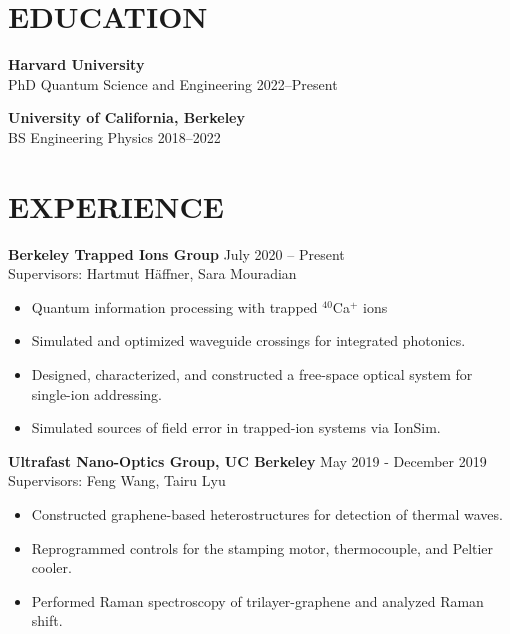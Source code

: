 \documentclass[margin, 10pt]{res} %
\begin{document}
\begin{resume}


\section{EDUCATION} 

{\textbf{Harvard University}}\\
 PhD Quantum Science and Engineering \hfill 2022--Present

{\textbf{University of California, Berkeley}}\\
BS Engineering Physics \hfill 2018--2022
 
 
\section{EXPERIENCE}

{\textbf{Berkeley Trapped Ions Group}} \hfill July 2020 – Present\\
Supervisors: Hartmut H\"{a}ffner, Sara Mouradian
\begin{itemize}
\item Quantum information processing with trapped $^{40}$Ca$^{+}$ ions
\item Simulated and optimized waveguide crossings for integrated photonics.
\item Designed, characterized, and constructed a free-space optical system for single-ion addressing.
\item Simulated sources of field error in trapped-ion systems via IonSim.
\end{itemize}

{\textbf{Ultrafast Nano-Optics Group, UC Berkeley}} \hfill May 2019 - December 2019\\
Supervisors: Feng Wang, Tairu Lyu 
\begin{itemize}
\item Constructed graphene-based heterostructures for detection of thermal waves.
\item Reprogrammed controls for the stamping motor, thermocouple, and Peltier cooler.
\item Performed Raman spectroscopy of trilayer-graphene and analyzed Raman shift.
\end{itemize}


\end{resume}
\end{document}
